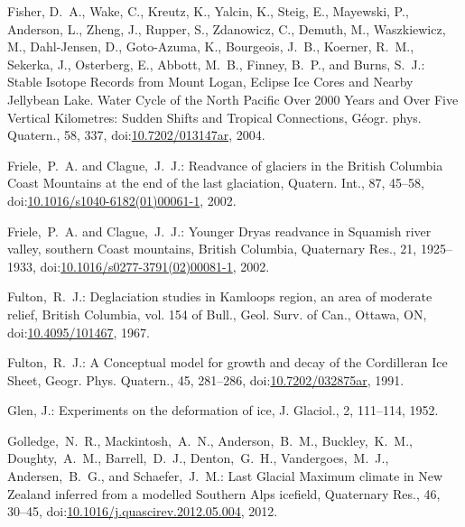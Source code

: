 \documentclass[tc, manuscript]{copernicus}
\begin{document}
\begin{thebibliography}{114}
Fisher, D.~A., Wake, C., Kreutz, K., Yalcin, K., Steig, E., Mayewski, P., Anderson, L., Zheng, J., Rupper, S., Zdanowicz, C., Demuth, M., Waszkiewicz, M., Dahl-Jensen, D., Goto-Azuma, K., Bourgeois, J.~B., Koerner, R.~M., Sekerka, J., Osterberg, E., Abbott, M.~B., Finney, B.~P., and Burns, S.~J.: Stable Isotope Records from Mount Logan, Eclipse Ice Cores and Nearby Jellybean Lake. Water Cycle of the North Pacific Over 2000 Years and Over Five Vertical Kilometres: Sudden Shifts and Tropical Connections, G\'{e}ogr. phys. Quatern., 58, 337,
doi:\href{http://dx.doi.org/10.7202/013147ar}{10.7202/013147ar}, 2004.


Friele,~P.~A. and Clague,~J.~J.: Readvance of glaciers in the British Columbia Coast Mountains at the end of the last glaciation, Quatern. Int., 87, 45--58,
doi:\href{http://dx.doi.org/10.1016/s1040-6182(01)00061-1}{10.1016/s1040-6182(01)00061-1}, 2002{}.


Friele,~P.~A. and Clague,~J.~J.: Younger Dryas readvance in Squamish river valley, southern Coast mountains, British Columbia, Quaternary Res., 21, 1925--1933,
doi:\href{http://dx.doi.org/10.1016/s0277-3791(02)00081-1}{10.1016/s0277-3791(02)00081-1}, 2002{}.


Fulton,~R.~J.: Deglaciation studies in Kamloops region, an area of moderate relief, British Columbia, vol. 154 of Bull., Geol. Surv. of Can., Ottawa, ON,
doi:\href{http://dx.doi.org/10.4095/101467}{10.4095/101467}, 1967.


Fulton,~R.~J.: A Conceptual model for growth and decay of the Cordilleran Ice Sheet, G{e}ogr. Phys. Quatern., 45, 281--286,
doi:\href{http://dx.doi.org/10.7202/032875ar}{10.7202/032875ar}, 1991.


Glen, J.: Experiments on the deformation of ice, J. Glaciol., 2, 111--114, 1952.


Golledge,~N.~R., Mackintosh,~A.~N., Anderson,~B.~M., Buckley,~K.~M., Doughty,~A.~M., Barrell,~D.~J., Denton,~G.~H., Vandergoes,~M.~J., Andersen,~B.~G., and Schaefer,~J.~M.: Last Glacial Maximum climate in {N}ew {Z}ealand inferred from a modelled {S}outhern {A}lps icefield, Quaternary Res., 46, 30--45,
doi:\href{http://dx.doi.org/10.1016/j.quascirev.2012.05.004}{10.1016/j.quascirev.2012.05.004}, 2012.



\end{thebibliography}
\end{document}
